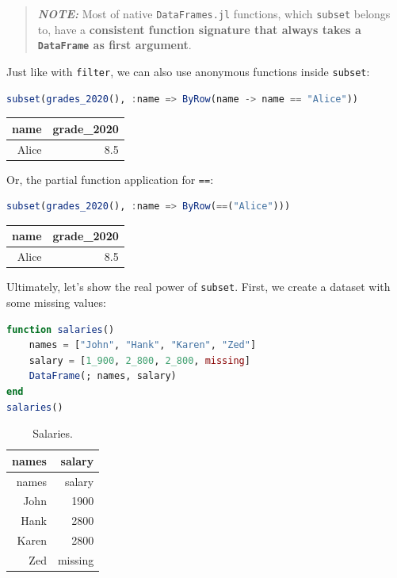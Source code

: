 \documentclass[
  notoc %
]{tufte-book}
\newcommand{\passthrough}[1]{#1}
\begin{document}
\begin{quote}
\textbf{\emph{NOTE:}} Most of native
\passthrough{\lstinline!DataFrames.jl!} functions, which
\passthrough{\lstinline!subset!} belongs to, have a \textbf{consistent
function signature that always takes a
\passthrough{\lstinline!DataFrame!} as first argument}.
\end{quote}

Just like with \passthrough{\lstinline!filter!}, we can also use
anonymous functions inside \passthrough{\lstinline!subset!}:

\begin{lstlisting}[language=Julia]
subset(grades_2020(), :name => ByRow(name -> name == "Alice"))
\end{lstlisting}

\begin{longtable}[]{@{}rr@{}}
\toprule()
name & grade\_2020 \\
\midrule()
\endhead
Alice & 8.5 \\
\bottomrule()
\end{longtable}

Or, the partial function application for \passthrough{\lstinline!==!}:

\begin{lstlisting}[language=Julia]
subset(grades_2020(), :name => ByRow(==("Alice")))
\end{lstlisting}

\begin{longtable}[]{@{}rr@{}}
\toprule()
name & grade\_2020 \\
\midrule()
\endhead
Alice & 8.5 \\
\bottomrule()
\end{longtable}

Ultimately, let's show the real power of
\passthrough{\lstinline!subset!}. First, we create a dataset with some
missing values:

\begin{lstlisting}[language=Julia]
function salaries()
    names = ["John", "Hank", "Karen", "Zed"]
    salary = [1_900, 2_800, 2_800, missing]
    DataFrame(; names, salary)
end
salaries()
\end{lstlisting}

\hypertarget{tbl:salaries}{}
\begin{longtable}[]{@{}rr@{}}
\caption{\label{tbl:salaries}Salaries.}\tabularnewline
\toprule()
names & salary \\
\midrule()
\endfirsthead
\toprule()
names & salary \\
\midrule()
\endhead
John & 1900 \\
Hank & 2800 \\
Karen & 2800 \\
Zed & missing \\
\bottomrule()
\end{longtable}
\end{document}

